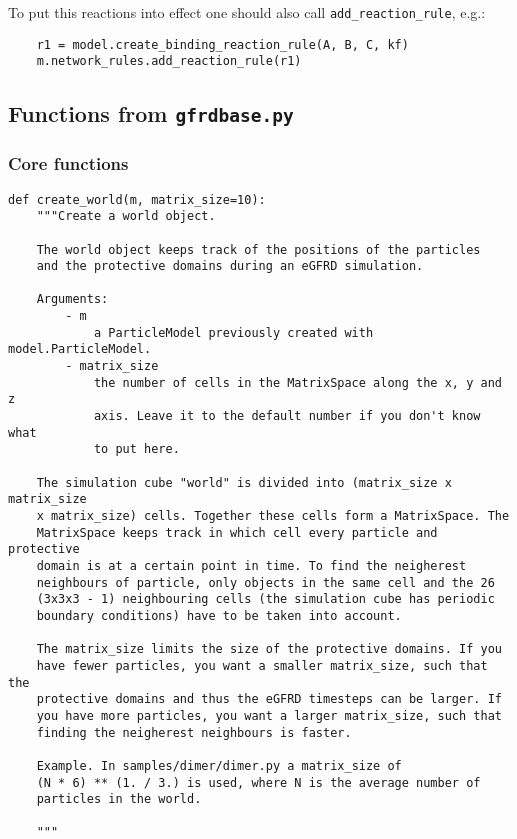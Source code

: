 \documentclass[a4paper,10pt]{article}
\begin{document}
To put this reactions into effect one should also call \texttt{add\_reaction\_rule}, e.g.:
\begin{verbatim}
    r1 = model.create_binding_reaction_rule(A, B, C, kf)
    m.network_rules.add_reaction_rule(r1)
\end{verbatim}

\subsection{Functions from \texttt{gfrdbase.py}}

\subsubsection{Core functions}

\begin{verbatim}
def create_world(m, matrix_size=10):
    """Create a world object.
    
    The world object keeps track of the positions of the particles
    and the protective domains during an eGFRD simulation.

    Arguments:
        - m
            a ParticleModel previously created with model.ParticleModel.
        - matrix_size
            the number of cells in the MatrixSpace along the x, y and z 
            axis. Leave it to the default number if you don't know what 
            to put here.

    The simulation cube "world" is divided into (matrix_size x matrix_size 
    x matrix_size) cells. Together these cells form a MatrixSpace. The 
    MatrixSpace keeps track in which cell every particle and protective 
    domain is at a certain point in time. To find the neigherest 
    neighbours of particle, only objects in the same cell and the 26 
    (3x3x3 - 1) neighbouring cells (the simulation cube has periodic
    boundary conditions) have to be taken into account.

    The matrix_size limits the size of the protective domains. If you 
    have fewer particles, you want a smaller matrix_size, such that the 
    protective domains and thus the eGFRD timesteps can be larger. If 
    you have more particles, you want a larger matrix_size, such that 
    finding the neigherest neighbours is faster.
    
    Example. In samples/dimer/dimer.py a matrix_size of
    (N * 6) ** (1. / 3.) is used, where N is the average number of 
    particles in the world.

    """
\end{verbatim}
\end{document}
